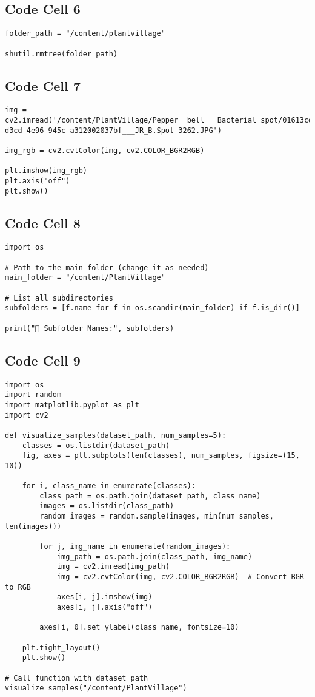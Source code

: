 \documentclass{article}
\begin{document}
\subsection*{Code Cell 6}
\begin{lstlisting}
folder_path = "/content/plantvillage"

shutil.rmtree(folder_path)
\end{lstlisting}

\subsection*{Code Cell 7}
\begin{lstlisting}
img = cv2.imread('/content/PlantVillage/Pepper__bell___Bacterial_spot/01613cd0-d3cd-4e96-945c-a312002037bf___JR_B.Spot 3262.JPG')

img_rgb = cv2.cvtColor(img, cv2.COLOR_BGR2RGB)

plt.imshow(img_rgb)
plt.axis("off")
plt.show()
\end{lstlisting}

\subsection*{Code Cell 8}
\begin{lstlisting}
import os

# Path to the main folder (change it as needed)
main_folder = "/content/PlantVillage"

# List all subdirectories
subfolders = [f.name for f in os.scandir(main_folder) if f.is_dir()]

print("📂 Subfolder Names:", subfolders)
\end{lstlisting}

\subsection*{Code Cell 9}
\begin{lstlisting}
import os
import random
import matplotlib.pyplot as plt
import cv2

def visualize_samples(dataset_path, num_samples=5):
    classes = os.listdir(dataset_path)
    fig, axes = plt.subplots(len(classes), num_samples, figsize=(15, 10))

    for i, class_name in enumerate(classes):
        class_path = os.path.join(dataset_path, class_name)
        images = os.listdir(class_path)
        random_images = random.sample(images, min(num_samples, len(images)))

        for j, img_name in enumerate(random_images):
            img_path = os.path.join(class_path, img_name)
            img = cv2.imread(img_path)
            img = cv2.cvtColor(img, cv2.COLOR_BGR2RGB)  # Convert BGR to RGB
            axes[i, j].imshow(img)
            axes[i, j].axis("off")

        axes[i, 0].set_ylabel(class_name, fontsize=10)

    plt.tight_layout()
    plt.show()

# Call function with dataset path
visualize_samples("/content/PlantVillage")
\end{lstlisting}
\end{document}
